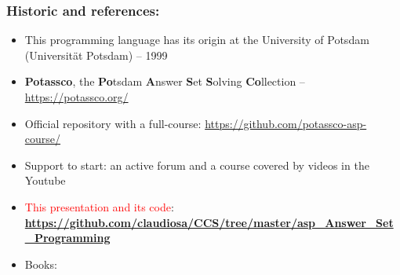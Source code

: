 \documentclass{beamer}
\begin{document}
\begin{frame}%

\frametitle{Historic and references:}

\begin{block}{}
  \begin{itemize}
   \item This programming language has its origin at the University of Potsdam (Universität Potsdam) -- 1999
   
   \item  \textbf{Potassco}, the \textbf{Po}tsdam \textbf{A}nswer \textbf{S}et \textbf{S}olving \textbf{Co}llection -- \url{https://potassco.org/}
   
   \item Official repository with a full-course: \url{https://github.com/potassco-asp-course/}

  \item Support to start: an active forum and a course covered by videos in the Youtube
  
  \item \textcolor{red}{This presentation and its code}:\\
   \textbf{\textcolor{blue}{\url{https://github.com/claudiosa/CCS/tree/master/asp_Answer_Set_Programming}}}
  
  \item Books: 

 \end{itemize}
  
\end{block}

\end{frame}


\end{document}
